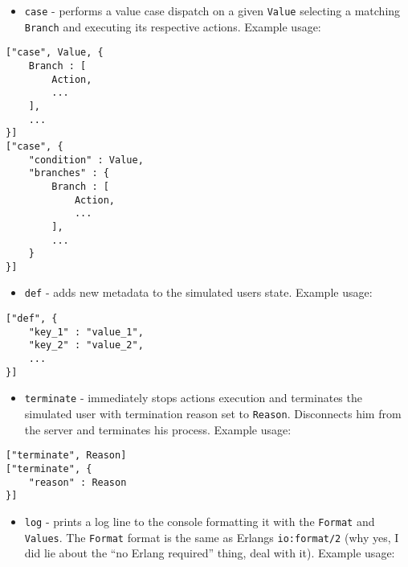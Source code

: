\documentclass[a4paper]{article}
\begin{document}
\begin{itemize}
\item \texttt{case} - performs a value case dispatch on a given \texttt{Value} selecting a matching \texttt{Branch} and executing its respective actions. Example usage:
\end{itemize}

\begin{verbatim}
["case", Value, {
    Branch : [
        Action,
        ...
    ],
    ...
}]
["case", {
    "condition" : Value,
    "branches" : {
        Branch : [
            Action,
            ...
        ],
        ...
    }
}]
\end{verbatim}





\begin{itemize}
\item \texttt{def} - adds new metadata to the simulated users state. Example usage:
\end{itemize}

\begin{verbatim}
["def", {
    "key_1" : "value_1",
    "key_2" : "value_2",
    ...
}]
\end{verbatim}





\begin{itemize}
\item \texttt{terminate} - immediately stops actions execution and terminates the simulated user with termination reason set to \texttt{Reason}. Disconnects him from the server and terminates his process. Example usage:
\end{itemize}

\begin{verbatim}
["terminate", Reason]
["terminate", {
    "reason" : Reason
}]
\end{verbatim}





\begin{itemize}
\item \texttt{log} - prints a log line to the console formatting it with the \texttt{Format} and \texttt{Values}. The \texttt{Format} format is the same as Erlangs \texttt{io:format/2} (why yes, I did lie about the ``no Erlang required'' thing, deal with it). Example usage:
\end{itemize}
\end{document}
